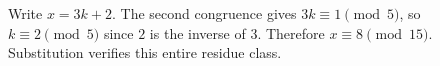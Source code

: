 Write $x=3k+2$. The second congruence gives $3k\equiv1\pmod5$, so $k\equiv2\pmod5$ since $2$ is the inverse of $3$. Therefore $\boxed{x\equiv8\pmod{15}}$. Substitution verifies this entire residue class.
